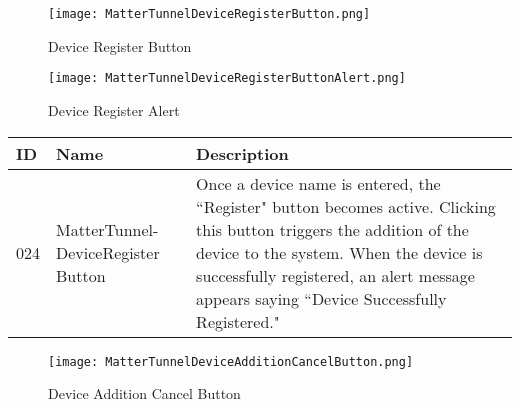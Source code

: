 \documentclass[conference]{IEEEtran}
\begin{document}
\begin{enumerate}[itemsep=2ex, parsep=1ex]
\begin{enumerate}[itemsep=2ex, parsep=1ex]
	      	      \begin{figure}[h!]
	      	      	\centering
	      	      	\texttt{[image: MatterTunnelDeviceRegisterButton.png]}
	      	      	\caption{Device Register Button}
	      	      	\label{fig:MatterTunnelDeviceRegisterButton}
	      	      \end{figure}
	      	      
	      	      \begin{figure}[h!]
	      	      	\centering
	      	      	\texttt{[image: MatterTunnelDeviceRegisterButtonAlert.png]}
	      	      	\caption{Device Register Alert}
	      	      	\label{fig:DeviceRegisterAlert}
	      	      \end{figure}
	      	      	      	      
	      	      \begin{table}[h!]
	      	      	\def\arraystretch{1.24} \small
	      	      	\begin{tabular}{|p{1.2cm}|p{2.5cm}|p{4.0cm}|}
	      	      		\hline
	      	      		ID  & Name                               & Description                                                                                                                                                                                                                                                  \\
	      	      		\hline
	      	      		024 & MatterTunnel-DeviceRegister Button & Once a device name is entered, the ``Register" button becomes active. Clicking this button triggers the addition of the device to the system. When the device is successfully registered, an alert message appears saying ``Device Successfully Registered." \\
	      	      		\hline
	      	      	\end{tabular}
	      	      \end{table}
	      	      
	      	      \begin{figure}[h!]
	      	      	\centering
	      	      	\texttt{[image: MatterTunnelDeviceAdditionCancelButton.png]}
	      	      	\caption{Device Addition Cancel Button}
	      	      	\label{fig:DeviceAdditionCancelButton}
	      	      \end{figure}

                  \vspace{5cm}
	      	      	      	      

\end{enumerate}
\end{enumerate}
\end{document}
